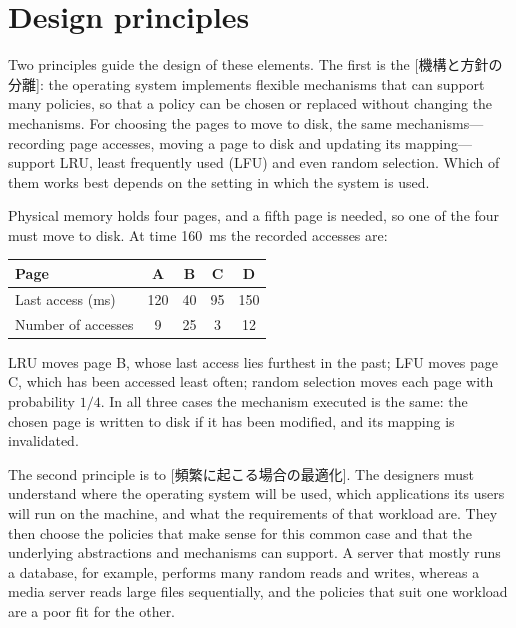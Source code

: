 \documentclass[../main.tex]{subfiles}
\begin{document}
\section{Design principles}
\label{sec:l01-principles}

Two principles guide the design of these elements.  The first is the
[機構と方針の分離]: the operating
system implements flexible mechanisms that can support many policies, so
that a policy can be chosen or replaced without changing the mechanisms.
For choosing the pages to move to disk, the same mechanisms---recording
page accesses, moving a page to disk and updating its mapping---support
LRU, least frequently used (LFU) and even random selection.  Which of them
works best depends on the setting in which the system is used.

\begin{example}
  Physical memory holds four pages, and a fifth page is needed, so one of
  the four must move to disk.  At time \SI{160}{\milli\second} the
  recorded accesses are:
  \begin{center}
    \small
    \begin{tabular}{@{}lcccc@{}}
      \toprule
      Page & A & B & C & D \\
      \midrule
      Last access (\si{\milli\second}) & 120 & 40 & 95 & 150 \\
      Number of accesses & 9 & 25 & 3 & 12 \\
      \bottomrule
    \end{tabular}
  \end{center}
  LRU moves page B, whose last access lies furthest in the past; LFU moves
  page C, which has been accessed least often; random selection moves each
  page with probability $1/4$.  In all three cases the mechanism executed
  is the same: the chosen page is written to disk if it has been
  modified, and its mapping is invalidated.
\end{example}

The second principle is to [頻繁に起こる場合の最適化].
The designers must understand where the operating system will be used,
which applications its users will run on the machine, and what the
requirements of that workload are.  They then choose the policies that
make sense for this common case and that the underlying abstractions and
mechanisms can support.  A server that mostly runs a database, for
example, performs many random reads and writes, whereas a media server
reads large files sequentially, and the policies that suit one workload
are a poor fit for the other.
\end{document}
